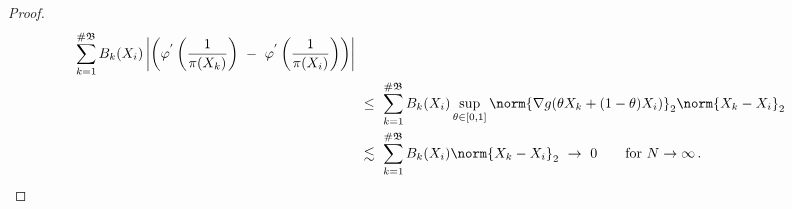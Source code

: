 \begin{proof}
\begin{align*}
   \sum_{k=1}^{\# \mathfrak{B}} 
   B_k(X_i)
   \left| 
   \left( 
   \varphi^{'}
   \left( 
     \frac{1}{\pi(X_k)}
   \right)
   \ 
   -
   \ 
   \varphi^{'}
   \left( 
     \frac{1}{\pi(X_i)}
   \right)
   \right)
   \right| 
\\
   &
   \ 
   \le
   \ 
   \sum_{k=1}^{\# \mathfrak{B}} 
   B_k(X_i)
   \sup_{\theta\in[0,1]}
   \norm{
     \nabla g
     (
     \theta X_k
     +
     (1-\theta)
     X_i
     )
   }_2
   \norm{X_k-X_i}_2
\\
   &
   \ 
   \lesssim
   \ 
   \sum_{k=1}^{\# \mathfrak{B}} 
   B_k(X_i)
   \norm{X_k-X_i}_2
   \ 
   \to
   \ 
   0
   \qquad
   \text{for}
   \ 
   N\to\infty
   \,.
      \end{align*}
\end{proof}


